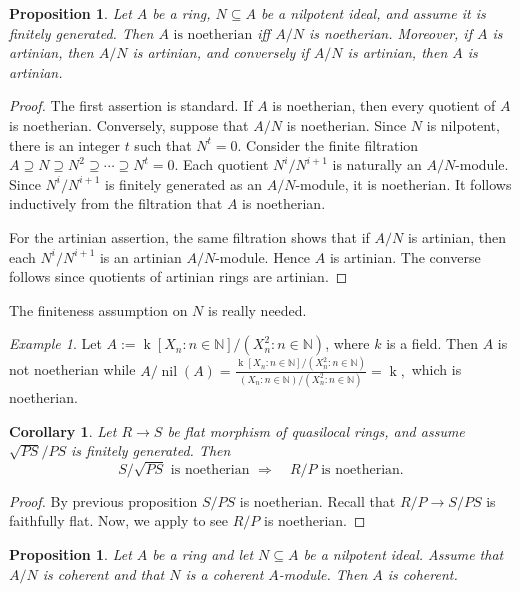 \documentclass[10pt,a4paper]{amsart}
\newtheorem{proposition}[theorem]{Proposition}
\newtheorem{corollary}[theorem]{Corollary}
\theoremstyle{definition}
\theoremstyle{remark}
\newtheorem{example}[theorem]{Example}
\newcommand{\nil}{\operatorname{nil}}
\newcommand{\kk}{\operatorname{k}}
\begin{document}
 \begin{proposition}
 	Let \(A\) be a  ring, \(N\subseteq A\) be a nilpotent
 	ideal, and assume it is finitely generated. Then
 $
 	A\text{ is noetherian}$ iff
 	$A/N$ { is noetherian}.
 Moreover, if \(A\) is artinian, then \(A/N\) is artinian, and conversely
 	if \(A/N\) is artinian, then \(A\) is artinian.
 \end{proposition}
 
 \begin{proof}
 	The first assertion is standard. If \(A\) is noetherian, then every
 	quotient of \(A\) is noetherian. Conversely, suppose that \(A/N\) is
noetherian. Since \(N\) is nilpotent, there is an integer \(t\) such
 	that
  $
 	N^t=0.
 	$ Consider the finite filtration
 $
 	A\supseteq N\supseteq N^2\supseteq\cdots\supseteq N^t=0.
 	$  Each quotient \(N^i/N^{i+1}\) is naturally an \(A/N\)-module. Since
 	\(N^i/N^{i+1}\) is finitely generated as an \(A/N\)-module, it is
 	noetherian. It follows inductively from the filtration that \(A\) is
 	noetherian.
 	
 	For the artinian assertion, the same filtration shows that if
 	\(A/N\) is artinian, then each
  $
 	N^i/N^{i+1}
 	$ is an artinian \(A/N\)-module. Hence \(A\) is artinian. The converse
 	follows since quotients of artinian rings are artinian.
 \end{proof}
The finiteness assumption on $N$ is really needed.
\begin{example}
	Let $A:=\kk[X_n:n\in \mathbb{N}]/(X_n^2:n\in \mathbb{N})$, where $k$ is a field. Then $A$ is not noetherian while 
	$A/ \nil(A)=\frac{\kk[X_n:n\in \mathbb{N}]/(X_n^2:n\in \mathbb{N})}{(X_n:n\in \mathbb{N})/(X_n^2:n\in \mathbb{N})}=\kk,$ which is noetherian.
\end{example}


\begin{corollary}
Let $R\to S$ be flat morphism of quasilocal rings, and assume \(\sqrt{PS}/PS\) is finitely generated.
Then  
\[
S/\sqrt{PS}\text{ is noetherian }\Longrightarrow\quad R/P\text{ is noetherian.} 
\]	
\end{corollary}

\begin{proof}
By previous proposition $S/ {PS}$ is noetherian. Recall that $R/P\to S/ {PS}$ is faithfully flat. Now, we apply \cite[Ex. 7.9]{mat} to see $R/P$  is noetherian. 
\end{proof}

\begin{proposition}
	Let \(A\) be a ring and let \(N\subseteq A\) be a nilpotent ideal. Assume
	that \(A/N\) is coherent and that \(N\) is a coherent \(A\)-module. Then
	\(A\) is coherent.
\end{proposition}
\end{document}
